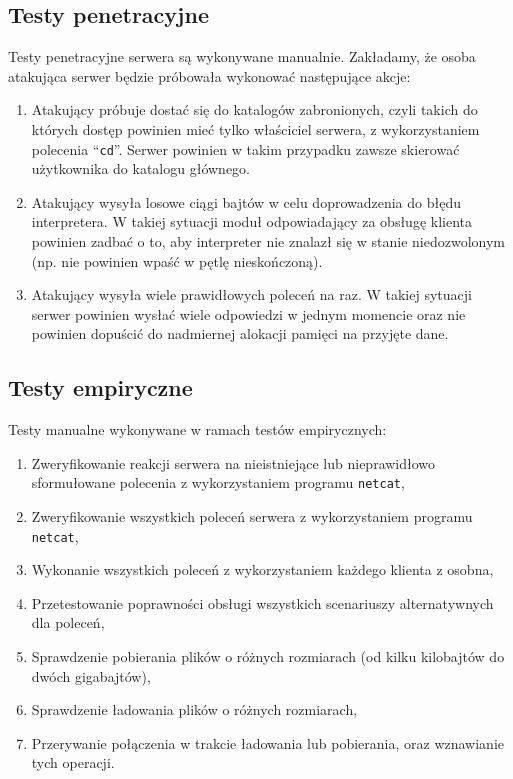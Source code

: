\documentclass[8pt,a4paper]{article}
\newcommand{\quotes}[1]{``#1''}
\newcommand{\quotcode}[1]{\quotes{\texttt{#1}}}
\begin{document}
\subsection{Testy penetracyjne}
Testy penetracyjne serwera są wykonywane manualnie. Zakładamy, że osoba atakująca serwer będzie próbowała wykonować następujące akcje:
\begin{enumerate}
    \item Atakujący próbuje dostać się do katalogów zabronionych, czyli takich do których dostęp powinien mieć tylko właściciel serwera, z wykorzystaniem polecenia \quotcode{cd}. Serwer powinien w takim przypadku zawsze skierować użytkownika do katalogu głównego.
    \item Atakujący wysyła losowe ciągi bajtów w celu doprowadzenia do błędu interpretera. W takiej sytuacji moduł odpowiadający za obsługę klienta powinien zadbać o to, aby interpreter nie znalazł się w stanie niedozwolonym (np. nie powinien wpaść w pętlę nieskończoną).
    \item Atakujący wysyła wiele prawidłowych poleceń na raz. W takiej sytuacji serwer powinien wysłać wiele odpowiedzi w jednym momencie oraz nie powinien dopuścić do nadmiernej alokacji pamięci na przyjęte dane.
\end{enumerate}

\subsection{Testy empiryczne}
\noindent Testy manualne wykonywane w ramach testów empirycznych:
\begin{enumerate}
    \item Zweryfikowanie reakcji serwera na nieistniejące lub nieprawidłowo sformułowane polecenia z wykorzystaniem programu \texttt{netcat},
    \item Zweryfikowanie wszystkich poleceń serwera z wykorzystaniem programu \texttt{netcat},
    \item Wykonanie wszystkich poleceń z wykorzystaniem każdego klienta z osobna,
    \item Przetestowanie poprawności obsługi wszystkich scenariuszy alternatywnych dla poleceń,
    \item Sprawdzenie pobierania plików o różnych rozmiarach (od kilku kilobajtów do dwóch gigabajtów),
    \item Sprawdzenie ładowania plików o różnych rozmiarach,
    \item Przerywanie połączenia w trakcie ładowania lub pobierania, oraz wznawianie tych operacji.
\end{enumerate}
\end{document}

